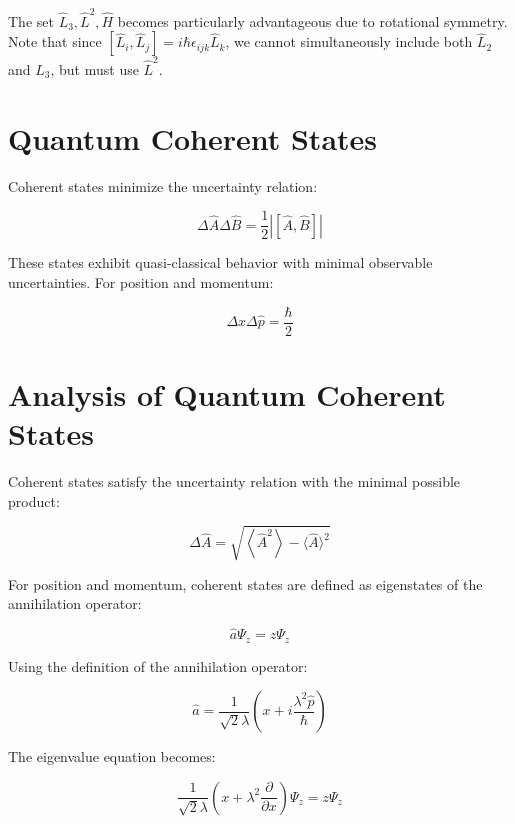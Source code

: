 The set $\hat{L}_{3}, \hat{L}^{2}, \hat{H}$ becomes particularly advantageous due to rotational symmetry. Note that since $\left[\hat{L}_{i}, \hat{L}_{j}\right]=i \hbar \epsilon_{i j k} \hat{L}_{k}$, we cannot simultaneously include both $\hat{L}_{2}$ and $\hat{L}_{3}$, but must use $\hat{L}^{2}$.

\section{Quantum Coherent States}
Coherent states minimize the uncertainty relation:

\begin{equation}
\Delta \hat{A} \Delta \hat{B}=\frac{1}{2}|[\hat{A}, \hat{B}]|
\end{equation}

These states exhibit quasi-classical behavior with minimal observable uncertainties. For position and momentum:

\begin{equation}
\Delta x \Delta \hat{p}=\frac{\hbar}{2}
\end{equation}


\section{Analysis of Quantum Coherent States}
Coherent states satisfy the uncertainty relation with the minimal possible product:

\begin{equation}
\Delta \hat{A}=\sqrt{\left\langle\hat{A}^{2}\right\rangle-\langle\hat{A}\rangle^{2}}
\end{equation}

For position and momentum, coherent states are defined as eigenstates of the annihilation operator:

\begin{equation}
\hat{a} \Psi_{z}=z \Psi_{z}
\end{equation}

Using the definition of the annihilation operator:

\begin{equation}
\hat{a}=\frac{1}{\sqrt{2} \lambda}\left(x+i \frac{\lambda^{2} \hat{p}}{\hbar}\right)
\end{equation}

The eigenvalue equation becomes:

\begin{equation}
\frac{1}{\sqrt{2} \lambda}\left(x+\lambda^{2} \frac{\partial}{\partial x}\right) \Psi_{z}=z \Psi_{z}
\end{equation}

